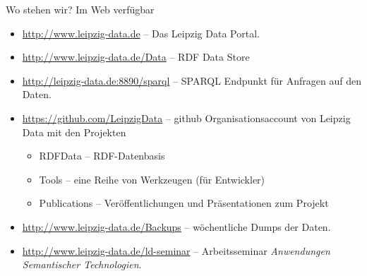 \documentclass{beamer}
\begin{document}
\begin{frame}{Wo stehen wir?}{}
Im Web verfügbar
\begin{itemize}
\item \url{http://www.leipzig-data.de} – Das Leipzig Data Portal.
\item \url{http://www.leipzig-data.de/Data} – RDF Data Store 
\item \url{http://leipzig-data.de:8890/sparql} – SPARQL Endpunkt für Anfragen
  auf den Daten.
\item \url{https://github.com/LeipzigData} – github Organisationsaccount von
  Leipzig Data mit den Projekten
  \begin{itemize}
  \item RDFData – RDF-Datenbasis
  \item Tools – eine Reihe von Werkzeugen (für Entwickler)
  \item Publications -- Veröffentlichungen und Präsentationen zum Projekt
  \end{itemize}
\item \url{http://www.leipzig-data.de/Backups} – wöchentliche Dumps der
  Daten.
\item \url{http://www.leipzig-data.de/ld-seminar} – Arbeitsseminar
  \emph{Anwendungen Semantischer Technologien}.
\end{itemize}
\end{frame}
\end{document}
